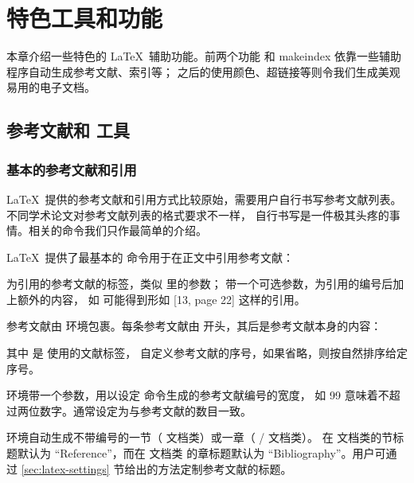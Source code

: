 \chapter{特色工具和功能}\label{chap:spec}

\begin{intro}
本章介绍一些特色的 \LaTeX\ 辅助功能。前两个功能  和 makeindex 依靠一些辅助程序自动生成参考文献、索引等；
之后的使用颜色、超链接等则令我们生成美观易用的电子文档。
\end{intro}

\section{参考文献和  工具}\label{sec:bib}

\subsection{基本的参考文献和引用}\label{subsec:bib-basics}

\LaTeX\ 提供的参考文献和引用方式比较原始，需要用户自行书写参考文献列表。不同学术论文对参考文献列表的格式要求不一样，
自行书写是一件极其头疼的事情。相关的命令我们只作最简单的介绍。

\LaTeX\ 提供了最基本的  命令用于在正文中引用参考文献：
\begin{command}
\end{command}

 为引用的参考文献的标签，类似  里的参数； 带一个可选参数，为引用的编号后加上额外的内容，
如  可能得到形如 [13, page 22] 这样的引用。

参考文献由  环境包裹。每条参考文献由  开头，其后是参考文献本身的内容：
\begin{command}
\end{command}

其中  是  使用的文献标签，
 自定义参考文献的序号，如果省略，则按自然排序给定序号。

 环境带一个参数，用以设定  命令生成的参考文献编号的宽度，
如 99 意味着不超过两位数字。通常设定为与参考文献的数目一致。

 环境自动生成不带编号的一节（ 文档类）或一章（ /  文档类）。
在  文档类的节标题默认为 ``Reference''{}，而在  文档类
的章标题默认为 ``Bibliography''{}。用户可通过 \ref{sec:latex-settings} 节给出的方法定制参考文献的标题。

